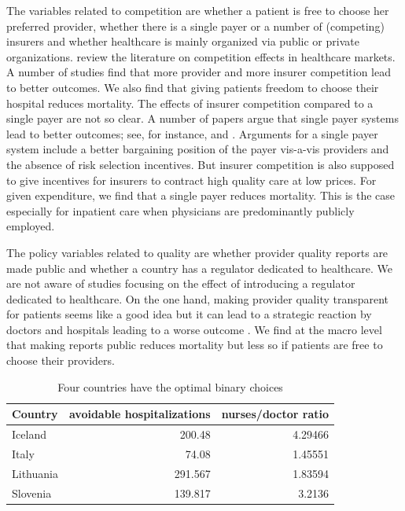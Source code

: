 \documentclass{article}
\begin{document}
The variables related to competition are whether a patient is free to choose her preferred provider, whether there is a single payer or a number of (competing) insurers and whether healthcare is mainly organized via public or private organizations. \cite{NBERw19800} review the literature on competition effects in healthcare markets. A number of studies find that more provider and more insurer competition lead to better outcomes. We also find that giving patients freedom to choose their hospital reduces mortality. The effects of insurer competition compared to a single payer are not so clear. A number of papers argue that single payer systems lead to better outcomes; see, for instance, \cite{BICHAY2020113454} and \cite{OberlanderSinglePayer}. Arguments for a single payer system include a better bargaining position of the payer vis-a-vis providers and the absence of risk selection incentives. But insurer competition is also supposed to give incentives for insurers to contract high quality care at low prices. For given expenditure, we find that a single payer reduces mortality. This is the case especially for inpatient care when physicians are predominantly publicly employed.

The policy variables related to quality are whether provider quality reports are made public and whether a country has a regulator dedicated to healthcare. We are not aware of studies focusing on the effect of introducing a regulator dedicated to healthcare. On the one hand, making provider quality transparent for patients seems like a good idea but it can lead to a strategic reaction by doctors and hospitals leading to a worse outcome \citep{dranoveReportCards2003}. We find at the macro level that making reports public reduces mortality but less so if patients are free to choose their providers.


\begin{table}[htbp]
\caption{\label{tab:org84e05ef}Four countries have the optimal binary choices}
\centering
\begin{tabular}{lrr}
Country & avoidable hospitalizations & nurses/doctor ratio\\
\hline
Iceland & 200.48 & 4.29466\\
Italy & 74.08 & 1.45551\\
Lithuania & 291.567 & 1.83594\\
Slovenia & 139.817 & 3.2136\\
\end{tabular}
\end{table}
\end{document}

